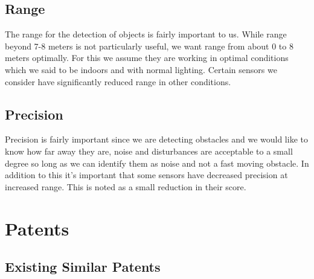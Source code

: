 \documentclass[oneside,final,a4paper]{report}
\begin{document}
\subsection{Range}
The range for the detection of objects is fairly important to us. While range beyond 7-8 meters is not particularly useful, we want range from about 0 to 8 meters optimally. For this we assume they are working in optimal conditions which we said to be indoors and with normal lighting. Certain sensors we consider have significantly reduced range in other conditions.

\subsection{Precision}
Precision is fairly important since we are detecting obstacles and we would like to know how far away they are, noise and disturbances are acceptable to a small degree so long as we can identify them as noise and not a fast moving obstacle. In addition to this it’s important that some sensors have decreased precision at increased range. This is noted as a small reduction in their score.

\section{Patents}
\subsection{Existing Similar Patents}
\end{document}
